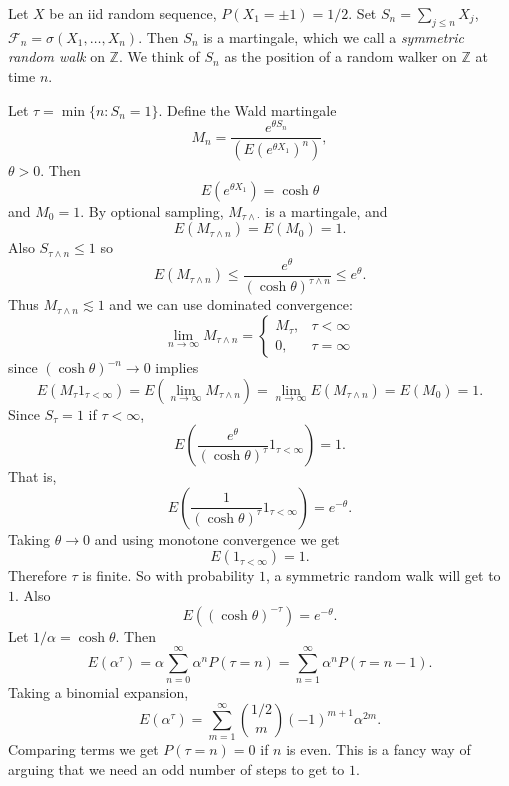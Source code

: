 \documentclass[12pt]{book}
\newcommand{\ZZ}{\mathbb{Z}}
\newcommand{\dfn}[1]{\emph{#1}\index{#1}}
\theoremstyle{definition}
\newenvironment{example}
  {\pushQED{\qed}\renewcommand{\qedsymbol}{$\diamondsuit$}\examplex}
  {\popQED\endexamplex}
\begin{document}
\begin{example}
Let $X$ be an iid random sequence, $P(X_1 = \pm 1) = 1/2$.
Set $S_n = \sum_{j \leq n} X_j$, $\mathcal F_n = \sigma(X_1, \dots, X_n)$.
Then $S_n$ is a martingale, which we call a \dfn{symmetric random walk} on $\ZZ$.
We think of $S_n$ as the position of a random walker on $\ZZ$ at time $n$.

Let $\tau = \min\{n: S_n = 1\}$.
Define the Wald martingale
$$M_n = \frac{e^{\theta S_n}}{(E(e^{\theta X_1})^n)},$$
$\theta > 0$. Then
$$E(e^{\theta X_1}) = \cosh \theta$$
and $M_0 = 1$.
By optional sampling, $M_{\tau \wedge \cdot}$ is a martingale, and
$$E(M_{\tau \wedge n}) = E(M_0) = 1.$$
Also $S_{\tau \wedge n} \leq 1$ so
$$E(M_{\tau \wedge n}) \leq \frac{e^\theta}{(\cosh \theta)^{\tau \wedge n}} \leq e^\theta.$$
Thus $M_{\tau \wedge n} \lesssim 1$ and we can use dominated convergence:
$$\lim_{n \to \infty} M_{\tau \wedge n} = \begin{cases}
M_\tau, &\tau < \infty\\
0, &\tau = \infty
\end{cases}$$
since $(\cosh \theta)^{-n} \to 0$ implies
$$E(M_\tau 1_{\tau < \infty}) = E(\lim_{n \to \infty} M_{\tau \wedge n}) = \lim_{n \to \infty} E(M_{\tau \wedge n}) = E(M_0) = 1.$$
Since $S_\tau = 1$ if $\tau < \infty$,
$$E(\frac{e^{\theta}}{(\cosh \theta)^\tau}1_{\tau < \infty}) = 1.$$
That is,
$$E(\frac{1}{(\cosh \theta)^\tau}1_{\tau < \infty}) = e^{-\theta}.$$
Taking $\theta \to 0$ and using monotone convergence we get
$$E(1_{\tau < \infty}) = 1.$$
Therefore $\tau$ is finite.
So with probability $1$, a symmetric random walk will get to $1$.
Also
$$E((\cosh \theta)^{-\tau}) = e^{-\theta}.$$
Let $1/\alpha = \cosh \theta$. Then
$$E(\alpha^\tau) = \alpha \sum_{n=0}^\infty \alpha^n P(\tau = n) = \sum_{n=1}^\infty \alpha^n P(\tau = n - 1).$$
Taking a binomial expansion,
$$E(\alpha^\tau) = \sum_{m=1}^\infty \binom{1/2}{m} (-1)^{m+1} \alpha^{2m}.$$
Comparing terms we get $P(\tau = n) = 0$ if $n$ is even.
This is a fancy way of arguing that we need an odd number of steps to get to $1$.
\end{example}
\end{document}
